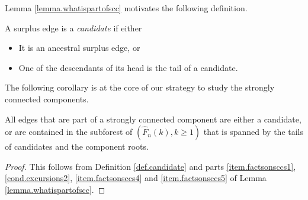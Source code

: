 Lemma \ref{lemma.whatispartofscc} motivates the following definition.
\begin{definition}\label{def.candidate}
A surplus edge is a \emph{candidate} if either
\begin{itemize}
    \item It is an ancestral surplus edge, or
    \item One of the descendants of its head is the tail of a candidate.
\end{itemize}
\end{definition}
The following corollary is at the core of our strategy to study the strongly connected components.
\begin{corollary}\label{cor.edgesinSCCs}
All edges that are part of a strongly connected component are either a candidate, or are contained in the subforest of $(\hat{F}_n(k),k\geq 1)$ that is spanned by the tails of candidates and the component roots.
\end{corollary}
\begin{proof}
This follows from Definition \ref{def.candidate} and parts \ref{item.factsonsccs1}, \ref{cond.excursions2}, \ref{item.factsonsccs4} and \ref{item.factsonsccs5} of Lemma \ref{lemma.whatispartofscc}.
\end{proof}
